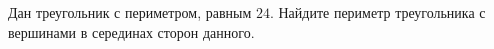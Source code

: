 \begin{ex}
	\begin{condition}
		Дан треугольник с периметром, равным \( 24  \). Найдите периметр треугольника с вершинами в серединах сторон
		данного.
	\end{condition}
\end{ex}